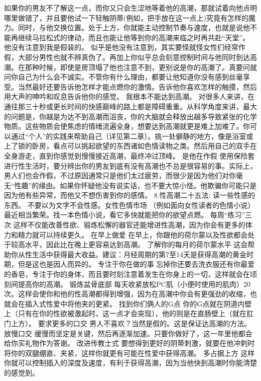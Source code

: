 \documentclass[12pt,UTF8]{ctexbook}
\begin{document}
如果你的男友不了解这一点，而你又只会生涩地等着他的高潮，那就试着向他点明哪里做错了，并且要他试一下轻触阴蒂(例如，把手放在这一点上)究竟有怎样的魔力。同时，与他交换位置。处于上方，你就能主动控制节奏与速度，也就是说他不能再继续马拉松式的律动，而且也能让他等到你的高潮来临之时再共赴“天堂”。
他没有注意到我是假装的。
似乎是他没有注意到，其实要怪就怪女性们经常作假，大部分男性也就不辨真伪了。再加上你似乎总会刻意控制时间与他同时到达高潮。在那种时候，即使是房顶塌了他也注意不到，更别说是你的高潮了。真要问就问你自己为什么会不诚实。不管你有什么理由，都要让他知道你没有感到丝毫享受。当然最好还要告诉他怎样才能点燃你的激情。告诉他你喜欢怎样的触摸，然后用大声的呻吟和叹息告诉他你的感觉。
我根本不能达到高潮。
对很多人来讲，在通往那三十秒或更长时间的快感巅峰的路上都是障碍重重。从科学角度来讲，最大的问题是，你越是为达不到高潮而沮丧，你的大脑就会释放出越多导致紧张的化学物质。这些物质会使焦虑的情绪流遍全身，想要达到高潮就更是难上加难了。你可以通过“个人”的实践来帮助自己（详见第二章）。挑一处僻静的地方，像是浴室或上了锁的卧房，看点可以挑起欲望的东西诸如色情读物之类。然后用自己的双手在全身游走，直到你感觉到慢慢接近高潮，最终冲过顶峰。
是他在作假
使用保险套进行性生活时，要分辨出你的男友到底有没有高潮也不总是很容易的事。实际上，男人们也会作假，不过原因通常只是他们太过疲劳，而很少是因为他们对你毫无“性趣”的缘由。如果你怀疑他没有说实话，也不要大惊小怪。他欺骗你可能只是因为他有些异常，而他又不想伤害到你的感情。
8.性高潮二十五法:
读一些性感的东西。
不要以为文字不会性感。女性色情市场 （例如面向女性读者的色情小说）最近相当繁荣。找一本色情小说，看它多快就能把你的欲望点燃。
每周“练习”三次
这样不仅能改善性欲、锻炼松懈的器官还能增进性高潮，因为你会有更多的体力和精力就可以持续更久。
在早上做爱
在早上，你跟他的荷尔蒙以及性欲都会处于较高水平，因此比在晚上更容易达到高潮。
了解你的每月的荷尔蒙水平
这会帮助你从性生活中获得最大收益。建议：月经周期的第7至14天是获得高潮的黄金时期，但是这也是因人而异的。
专注于你在做的事
忘掉你还要去洗衣服还有你最爱的香皂，专注于你的身体，而且要时刻注意着发生在你身上的一切，这样就会在顷刻间提高你的高潮。
锻炼盆骨底部
每天收紧放松PC肌（小便时使用的肌肉）20次。这样会使你和他的性高潮都得到增强，因为在高潮中你会有更强劲的收缩，也就会在插入式性爱中将他夹的更紧。
找到你们俩人的G点
你的G点就在阴道内壁上（只有在你的性欲被激起时，这一点才会突现），他的则是在直肠壁上（就在肛门上方）。
要求更多的口交
男人不喜欢？当然是假的。这是保证达高潮的方法。
放慢口交
缓慢而坚定是关键，然后再逐渐加速。只要你做好了，这一年里他都会给你买礼物作为答谢。
改进传教士式
要想得到更好的阴蒂刺激，就要在他冲刺时将你的双腿绷直、夹紧，这样你就更有可能在性爱中获得高潮。
多占据上方
这样你就可以控制插入的深度及速度，有利于获得高潮，因为当他快到高潮时你能清楚的感觉到。
\end{document}
